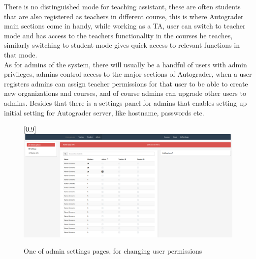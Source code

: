 There is no distinguished mode for teaching assistant, these are often students that are also registered as teachers in different course, this is where Autograder main sections come in handy, while working as a TA, user can switch to teacher mode and has access to the teachers functionality in the courses he teaches, similarly switching to student mode gives quick access to relevant functions in that mode.
\\As for admins of the system, there will usually be a handful of users with admin privileges, admins control access to the major sections of Autograder, when a user registers admins can assign teacher permissions for that user to be able to create new organizations and courses, and of course admins can upgrade other users to admins. Besides that there is a settings panel for admins that enables setting up initial setting for Autograder server, like hostname, passwords etc.
\begin{figure}[h]
 \scalebox{1}[0.9]{ {\includegraphics[width=1\linewidth]{graphs/admin.png}}}
  \caption{One of admin settings pages, for changing user permissions}
  \label{fig:adminpage}
\end{figure}
\newpage
